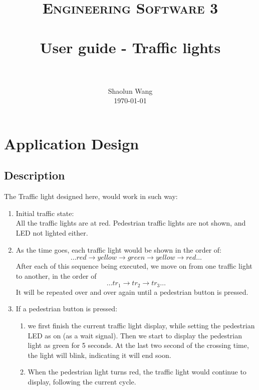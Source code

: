 \documentclass[a4paper,final]{scrartcl}
\title{
		\usefont{OT1}{bch}{b}{n}
		\normalfont \normalsize \textsc{Engineering Software 3} \\ [15pt]
		\horrule{0.5pt} \\[0.4cm]
		\huge User guide - Traffic lights \\
		\horrule{2pt}\\[0.5cm]
}
\author{
		\normalfont\normalsize
        Shaolun Wang\\[-3pt]\normalsize
        \today
}
\date{}
\numberwithin{equation}{section}		%
\numberwithin{figure}{section}			%
\numberwithin{table}{section}				%
\begin{document}
\maketitle
\section{Application Design}
\subsection{Description}
The Traffic light designed here, would work in such way:
	\begin{enumerate}
		\item Initial traffic state:\\ All the traffic lights are at red. Pedestrian traffic lights are not shown, and LED not lighted either.
		\item As the time goes, each traffic light would be shown in the order of: $$\ldots red \rightarrow yellow \rightarrow green \rightarrow yellow \rightarrow red \ldots$$
		After each of this sequence being executed, we move on from one traffic light to another, in the order of $$\ldots tr_1 \rightarrow tr_2 \rightarrow tr_3 \ldots$$
		It will be repeated over and over again until a pedestrian button is pressed. 

		\item If a pedestrian button is pressed:
			\begin{enumerate}
				\item  we first finish the current traffic light display, while setting the pedestrian LED as on (as a wait signal). Then we start to display the pedestrian light as green for 5 seconds. At the last two second of the crossing time, the light will blink, indicating it will end soon.
				\item When the pedestrian light turns red, the traffic light would continue to display, following the current cycle.

		\end{enumerate}
		
	\end{enumerate}
\end{document}
